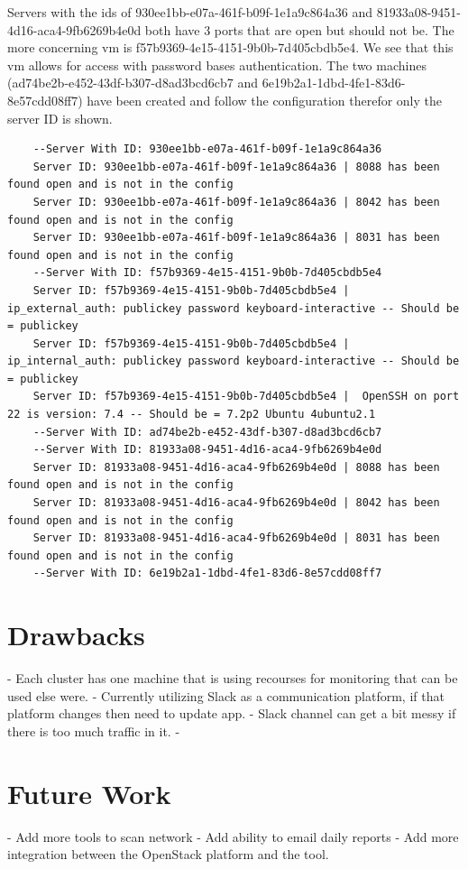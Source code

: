 \documentclass[12pt]{article}
\begin{document}
Servers with the ids of 930ee1bb-e07a-461f-b09f-1e1a9c864a36 and 81933a08-9451-4d16-aca4-9fb6269b4e0d both have 3 ports that are open but should not be. The more concerning vm is f57b9369-4e15-4151-9b0b-7d405cbdb5e4. We see that this vm allows for access with password bases authentication. The two machines (ad74be2b-e452-43df-b307-d8ad3bcd6cb7 and 6e19b2a1-1dbd-4fe1-83d6-8e57cdd08ff7) have been created and follow the configuration therefor only the server ID is shown.

\begin{lstlisting}
    --Server With ID: 930ee1bb-e07a-461f-b09f-1e1a9c864a36
    Server ID: 930ee1bb-e07a-461f-b09f-1e1a9c864a36 | 8088 has been found open and is not in the config
    Server ID: 930ee1bb-e07a-461f-b09f-1e1a9c864a36 | 8042 has been found open and is not in the config
    Server ID: 930ee1bb-e07a-461f-b09f-1e1a9c864a36 | 8031 has been found open and is not in the config
    --Server With ID: f57b9369-4e15-4151-9b0b-7d405cbdb5e4
    Server ID: f57b9369-4e15-4151-9b0b-7d405cbdb5e4 |  ip_external_auth: publickey password keyboard-interactive -- Should be = publickey
    Server ID: f57b9369-4e15-4151-9b0b-7d405cbdb5e4 |  ip_internal_auth: publickey password keyboard-interactive -- Should be = publickey
    Server ID: f57b9369-4e15-4151-9b0b-7d405cbdb5e4 |  OpenSSH on port 22 is version: 7.4 -- Should be = 7.2p2 Ubuntu 4ubuntu2.1
    --Server With ID: ad74be2b-e452-43df-b307-d8ad3bcd6cb7
    --Server With ID: 81933a08-9451-4d16-aca4-9fb6269b4e0d
    Server ID: 81933a08-9451-4d16-aca4-9fb6269b4e0d | 8088 has been found open and is not in the config
    Server ID: 81933a08-9451-4d16-aca4-9fb6269b4e0d | 8042 has been found open and is not in the config
    Server ID: 81933a08-9451-4d16-aca4-9fb6269b4e0d | 8031 has been found open and is not in the config
    --Server With ID: 6e19b2a1-1dbd-4fe1-83d6-8e57cdd08ff7
\end{lstlisting}

\section{Drawbacks}

- Each cluster has one machine that is using recourses for monitoring that can be used else were.
- Currently utilizing Slack as a communication platform, if that platform changes then need to update app.
- Slack channel can get a bit messy if there is too much traffic in it.
-

\section{Future Work}
- Add more tools to scan network
- Add ability to email daily reports
- Add more integration between the OpenStack platform and the tool.




\newpage


\end{document}
